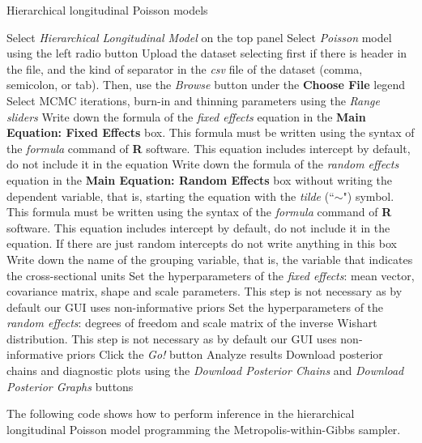 \begin{algorithm}[h!]
	\caption{Hierarchical longitudinal Poisson models}\label{alg:HPosi}
	\begin{algorithmic}[1]  		 			
		\State Select \textit{Hierarchical Longitudinal Model} on the top panel
		\State Select \textit{Poisson} model using the left radio button
		\State Upload the dataset selecting first if there is header in the file, and the kind of separator in the \textit{csv} file of the dataset (comma, semicolon, or tab). Then, use the \textit{Browse} button under the \textbf{Choose File} legend
		\State Select MCMC iterations, burn-in and thinning parameters using the \textit{Range sliders}
		\State Write down the formula of the \textit{fixed effects} equation in the \textbf{Main Equation: Fixed Effects} box. This formula must be written using the syntax of the \textit{formula} command of \textbf{R} software. This equation includes intercept by default, do not include it in the equation
		\State Write down the formula of the \textit{random effects} equation in the \textbf{Main Equation: Random Effects} box without writing the dependent variable, that is, starting the equation with the \textit{tilde} (``$\sim$") symbol. This formula must be written using the syntax of the \textit{formula} command of \textbf{R} software. This equation includes intercept by default, do not include it in the equation. If there are just random intercepts do not write anything in this box
		\State Write down the name of the grouping variable, that is, the variable that indicates the cross-sectional units 
		\State Set the hyperparameters of the \textit{fixed effects}: mean vector, covariance matrix, shape and scale parameters. This step is not necessary as by default our GUI uses non-informative priors
		\State Set the hyperparameters of the \textit{random effects}: degrees of freedom and scale matrix of the inverse Wishart distribution. This step is not necessary as by default our GUI uses non-informative priors
		\State Click the \textit{Go!} button
		\State Analyze results
		\State Download posterior chains and diagnostic plots using the \textit{Download Posterior Chains} and \textit{Download Posterior Graphs} buttons
	\end{algorithmic} 
\end{algorithm}
 
The following code shows how to perform inference in the hierarchical longitudinal Poisson model programming the Metropolis-within-Gibbs sampler.


